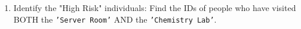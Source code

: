 \documentclass[12pt,a4paper]{article}
\begin{document}
\begin{enumerate}

\item Identify the "High Risk" individuals: Find the IDs of people who have visited BOTH the \texttt{'Server Room'} AND the \texttt{'Chemistry Lab'}.







\end{enumerate}
\end{document}
